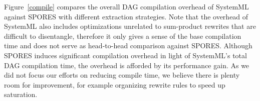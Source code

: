 Figure~\ref{compile} compares the overall DAG compilation overhead of SystemML
against SPORES with different extraction strategies.
Note that the overhead of SystemML also includes optimizations unrelated to sum-product rewrites that are difficult to disentangle, therefore it only gives a sense of the base compilation time and does not serve as head-to-head comparison against SPORES. 
Although SPORES induces significant compilation overhead in light of SystemML's total DAG compilation time, the overhead is afforded by
its performance gain. As we did not focus our efforts on
reducing compile time, we believe there is plenty room for improvement, for
example organizing rewrite rules to speed up saturation.